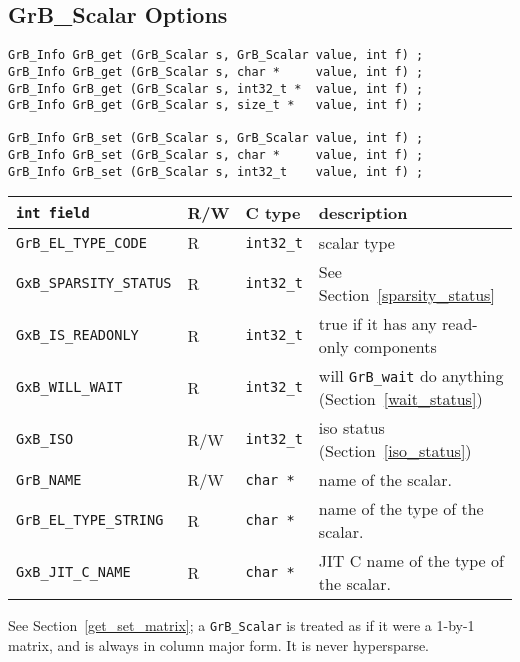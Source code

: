 

\newpage
\subsection{{\sf GrB\_Scalar} Options}
\label{get_set_scalar}

\begin{mdframed}[userdefinedwidth=6in]
{\footnotesize
\begin{verbatim}
GrB_Info GrB_get (GrB_Scalar s, GrB_Scalar value, int f) ;
GrB_Info GrB_get (GrB_Scalar s, char *     value, int f) ;
GrB_Info GrB_get (GrB_Scalar s, int32_t *  value, int f) ;
GrB_Info GrB_get (GrB_Scalar s, size_t *   value, int f) ;

GrB_Info GrB_set (GrB_Scalar s, GrB_Scalar value, int f) ;
GrB_Info GrB_set (GrB_Scalar s, char *     value, int f) ;
GrB_Info GrB_set (GrB_Scalar s, int32_t    value, int f) ;
\end{verbatim}
}\end{mdframed}

\noindent
{\small
\begin{tabular}{|l|l|l|p{3in}|}
\hline
\verb'int field'                    & R/W  & C type        & description \\
\hline

\verb'GrB_EL_TYPE_CODE'             & R    & \verb'int32_t'& scalar type \\
\verb'GxB_SPARSITY_STATUS'          & R    & \verb'int32_t'& See Section~\ref{sparsity_status} \\
\verb'GxB_IS_READONLY'              & R    & \verb'int32_t'& true if it has any read-only components \\
\verb'GxB_WILL_WAIT'                & R    & \verb'int32_t'& will \verb'GrB_wait' do anything (Section~\ref{wait_status}) \\ 
\verb'GxB_ISO'                      & R/W  & \verb'int32_t'& iso status (Section~\ref{iso_status}) \\
\hline
\verb'GrB_NAME'                     & R/W  & \verb'char *' & name of the scalar. \\
\verb'GrB_EL_TYPE_STRING'           & R    & \verb'char *' & name of the type of the scalar. \\
\verb'GxB_JIT_C_NAME'               & R    & \verb'char *' & JIT C name of the type of the scalar. \\
\hline
\end{tabular}
}
\vspace{0.1in}

See Section~\ref{get_set_matrix}; a \verb'GrB_Scalar' is treated as if it were
a 1-by-1 matrix, and is always in column major form.  It is never hypersparse.


